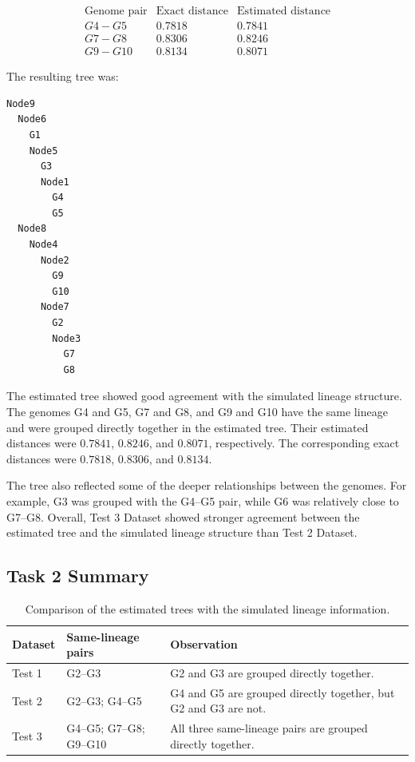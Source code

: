 \documentclass[11pt,a4paper]{article}
\begin{document}
\[
\begin{array}{c|c|c}
\text{Genome pair} & \text{Exact distance} & \text{Estimated distance} \\
\hline
G4-G5 & 0.7818 & 0.7841 \\
G7-G8 & 0.8306 & 0.8246 \\
G9-G10 & 0.8134 & 0.8071
\end{array}
\]


The resulting tree was:

\begin{lstlisting}
Node9
  Node6
    G1
    Node5
      G3
      Node1
        G4
        G5
  Node8
    Node4
      Node2
        G9
        G10
      Node7
        G2
        Node3
          G7
          G8
\end{lstlisting}

The estimated tree showed good agreement with the simulated lineage
structure. The genomes G4 and G5, G7 and G8, and G9 and G10 have the same
lineage and were grouped directly together in the estimated tree. Their
estimated distances were $0.7841$, $0.8246$, and $0.8071$, respectively.
The corresponding exact distances were $0.7818$, $0.8306$, and $0.8134$.

The tree also reflected some of the deeper relationships between the
genomes. For example, G3 was grouped with the G4--G5 pair, while G6 was
relatively close to G7--G8. Overall, Test 3 Dataset showed stronger agreement
between the estimated tree and the simulated lineage structure than
Test 2 Dataset.


\subsection{Task 2 Summary}

\begin{table}[H]
\centering
\small
\caption{Comparison of the estimated trees with the simulated lineage
information.}
\begin{tabular}{p{2.2cm}p{4.5cm}p{7cm}}
\toprule
Dataset & Same-lineage pairs & Observation\\
\midrule
Test 1
&
G2--G3
&
G2 and G3 are grouped directly together.
\\
\midrule
Test 2
&
G2--G3; G4--G5
&
G4 and G5 are grouped directly together, but G2 and G3 are not.
\\
\midrule
Test 3
&
G4--G5; G7--G8; G9--G10
&
All three same-lineage pairs are grouped directly together.
\\
\bottomrule
\end{tabular}
\end{table}
\end{document}

